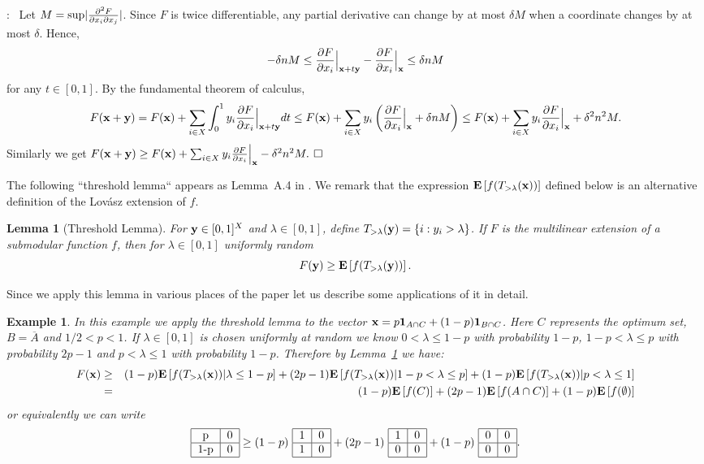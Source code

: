 \documentclass{article}[11pt]
\newtheorem{lemma}[theorem]{Lemma}
\newtheorem{example}[theorem]{Example}
\newcommand{\partdiff}[2]{\frac{\partial {#1}}{\partial {#2}}}
\newcommand{\mixdiff}[3]{\frac{\partial^2 {#1}}{{\partial {#2}}{\partial {#3}}}}
\newcommand{\E}[1]{{\bf{E}}\left[#1\right]}
\renewenvironment{proof}{\noindent{\bf Proof}:~}{$\hfill \Box$\\}
\newcommand{\T}[4] {\begin{tabular}{|c|c|}
\hline
#1 & #2 \\
\hline
#3 & #4 \\
\hline
\end{tabular}}
\def\b1{{\bf 1}}
\def\bx{{\bf x}}
\def\by{{\bf y}}
\def\sup{{\rm{sup}}}
\begin{document}
\begin{proof}
Let $M = \sup |\mixdiff{F}{x_i}{x_j}|$.
Since $F$ is twice differentiable, any partial derivative can change by at most
$\delta M$ when a coordinate changes by at most $\delta$. Hence,
$$ -\delta n M \leq \partdiff{F}{x_i} \Big|_{\bx+t\by} - \partdiff{F}{x_i} \Big|_\bx
 \leq \delta n M$$
for any $t \in [0,1]$. By the fundamental theorem of calculus,
$$ F(\bx+\by) = F(\bx) + \sum_{i \in X} \int_0^1 y_i \partdiff{F}{x_i} \Big|_{\bx+t\by} dt 
 \leq F(\bx) + \sum_{i \in X} y_i \left( \partdiff{F}{x_i} \Big|_\bx + \delta n M \right)
  \leq F(\bx) + \sum_{i \in X} y_i \partdiff{F}{x_i} \Big|_\bx + \delta^2 n^2 M.$$
Similarly we get $F(\bx+\by) \geq F(\bx) + \sum_{i \in X} y_i \partdiff{F}{x_i} \Big|_\bx
  - \delta^2 n^2 M.$
\end{proof}


The following ``threshold lemma`` appears as Lemma~A.4 in \cite{Vondrak09}.
We remark that the expression $\E{f(T_{>\lambda}(\bx))}$ defined below
is an alternative definition of the Lov\'asz extension of $f$.

\begin{lemma}[Threshold Lemma]
\label{lem:threshold}
For $\by \in [0,1]^X$ and $\lambda \in [0,1]$, define $T_{>\lambda}(\by)
 = \{ i: y_i > \lambda\}$. If $F$ is the multilinear extension of a submodular
function $f$, then for $\lambda \in [0,1]$ uniformly random
$$ F(\by) \geq \E{f(T_{>\lambda}(\by))}.$$
\end{lemma}

Since we apply this lemma in various places of the paper let us describe
some applications of it in detail.

\begin{example}
In this example we apply the threshold lemma to the vector $\bx=p\b1_{A\cap C}+(1-p)\b1_{B\cap C}$.
Here $C$ represents the optimum set, $B=\overline{A}$  and $1/2<p<1$.
If $\lambda\in[0,1]$ is chosen uniformly at random  we know $0 < \lambda \leq 1-p$
with probability $1-p$, $1-p <\lambda \leq p$ with probability $2p-1$
and $p<\lambda \leq 1$ with probability $1-p$. Therefore by Lemma~\ref{lem:threshold} we have:
\begin{eqnarray*}
F(\bx)  & \geq & (1-p) \E{f(T_{>\lambda}(\bx)) | \lambda \leq 1-p} +
 (2p-1) \E{f(T_{>\lambda}(\bx)) | 1-p<\lambda \leq p}+
 (1-p) \E{f(T_{>\lambda}(\bx)) | p<\lambda \leq 1}\\
&=& (1-p) \E{f(C)} + (2p-1) \E{f(A\cap C)}+(1-p) \E{f(\emptyset)}\\
\end{eqnarray*}
or equivalently we can write
\begin{equation}
\label{eq:threshold_easy}
\T{p}{0}{1-p}{0} \geq  (1-p)~\T{1}{0}{1}{0} + (2p-1)~\T{1}{0}{0}{0}+(1-p)~\T{0}{0}{0}{0}.
\end{equation}
\end{example}
\end{document}

